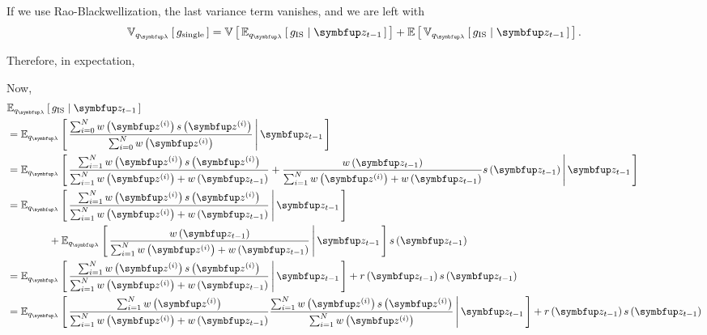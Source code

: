 \begin{proofEnd}
  If we use Rao-Blackwellization, the last variance term vanishes, and we are left with
  \begin{align}
    \Vsub{q_{\vlambda}}{g_{\mathrm{single}}}
    = \V{
      \Esub{q_{\vlambda}}{
        g_{\mathrm{IS}} \mid \vz_{t-1}
      }
    } 
    +
    \E{
      \Vsub{q_{\vlambda}}{
        g_{\mathrm{IS}} \mid \vz_{t-1}
      }
    }.
  \end{align}


  Therefore, in expectation, 

  Now, 
  \begin{align}
    &\Esub{q_{\vlambda}}{ g_{\mathrm{IS}} \mid \vz_{t-1}} \\
    &= \Esub{q_{\vlambda}}{ \frac{\sum_{i=0}^N w\left(\vz^{(i)}\right) s\left(\vz^{(i)}\right)}{\sum_{i=0}^N w\left(\vz^{(i)}\right)}  \,\middle\vert\, \vz_{t-1} } \\
    &= \Esub{q_{\vlambda}}{ \frac{\sum_{i=1}^N w\left(\vz^{(i)}\right) s\left(\vz^{(i)}\right)}{\sum_{i=1}^N w\left(\vz^{(i)}\right) + w\left(\vz_{t-1}\right)}  
    + \frac{w\left(\vz_{t-1}\right)}{\sum_{i=1}^N w\left(\vz^{(i)}\right) + w\left(\vz_{t-1}\right)} s\left(\vz_{t-1}\right) \,\middle\vert\, \vz_{t-1}} \\
    &= \Esub{q_{\vlambda}}{ \frac{ \sum_{i=1}^N  w\left(\vz^{(i)}\right) s\left(\vz^{(i)}\right)}{\sum_{i=1}^N w\left(\vz^{(i)}\right) + w\left(\vz_{t-1}\right)}  \,\middle\vert\, \vz_{t-1}} \\
    &\qquad\qquad + \Esub{q_{\vlambda}}{ \frac{w\left(\vz_{t-1}\right)}{\sum_{i=1}^N w\left(\vz^{(i)}\right) + w\left(\vz_{t-1}\right)} \,\middle\vert\, \vz_{t-1}} s\left(\vz_{t-1}\right) \\
    &= \Esub{q_{\vlambda}}{ \frac{\sum_{i=1}^N  w\left(\vz^{(i)}\right) s\left(\vz^{(i)}\right)}{\sum_{i=1}^N w\left(\vz^{(i)}\right) + w\left(\vz_{t-1}\right)}  \,\middle\vert\, \vz_{t-1}}
    + r\left(\vz_{t-1}\right) s\left(\vz_{t-1}\right) \\
    &= \Esub{q_{\vlambda}}{ \frac{\sum_{i=1}^N w\left(\vz^{(i)}\right)}{\sum_{i=1}^N w\left(\vz^{(i)}\right) + w\left(\vz_{t-1}\right)} \frac{\sum_{i=1}^N  w\left(\vz^{(i)}\right) s\left(\vz^{(i)}\right)}{\sum_{i=1}^N w\left(\vz^{(i)}\right)}  \,\middle\vert\, \vz_{t-1}}
    + r\left(\vz_{t-1}\right) s\left(\vz_{t-1}\right)
  \end{align}


\end{proofEnd}
